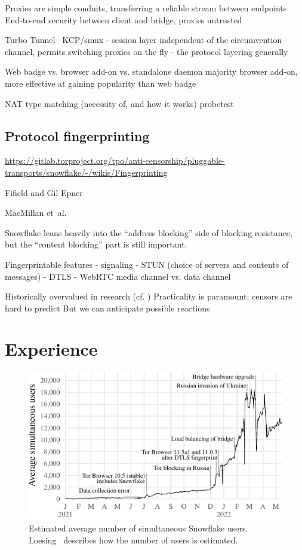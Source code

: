 \documentclass[letterpaper,twocolumn]{article}
\begin{document}

Proxies are simple conduits, transferring a reliable stream between endpoints
End-to-end security between client and bridge, proxies untrusted

Turbo Tunnel~\cite{Fifield2020a}
KCP/smux
- session layer independent of the circumvention channel, permits switching proxies on the fly
- the protocol layering generally

Web badge vs. browser add-on vs. standalone daemon
majority browser add-on, more effective at gaining popularity than web badge

NAT type matching (necessity of, and how it works)
probetest

\subsection{Protocol fingerprinting}


\url{https://gitlab.torproject.org/tpo/anti-censorship/pluggable-transports/snowflake/-/wikis/Fingerprinting}

Fifield and Gil Epner~\cite{arxiv.1605.08805}

MacMillan et~al.~\cite{arxiv.2008.03254}

Snowflake leans heavily into the ``address blocking'' side of blocking
resistance, but the ``content blocking'' part is still important.

Fingerprintable features
- signaling
- STUN (choice of servers and contents of messages)
- DTLS
- WebRTC media channel vs. data channel

Historically overvalued in research (cf. \cite{Tschantz2016a})
Practicality is paramount; censors are hard to predict
But we can anticipate possible reactions

\section{Experience}
\label{sec:experience}

\begin{figure}
\includegraphics{figures/users-global/users-global}
\caption{
Estimated average number of simultaneous Snowflake users.
Loesing~\cite{tor-tr-2012-10-001}
describes how the number of users is estimated.
}
\label{fig:user-counts}
\end{figure}
\end{document}
